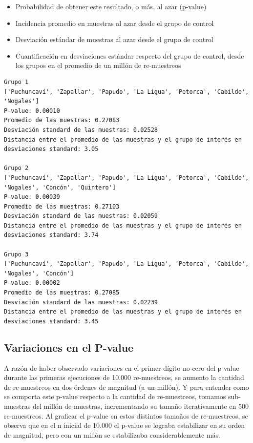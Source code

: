 \documentclass[]{article}
\providecommand{\tightlist}{%
  \setlength{\itemsep}{0pt}\setlength{\parskip}{0pt}}
\begin{document}
\begin{itemize}
\tightlist
\item
  Probabilidad de obtener este resultado, o más, al azar (p-value)
\item
  Incidencia promedio en muestras al azar desde el grupo de control
\item
  Desviación estándar de muestras al azar desde el grupo de control
\item
  Cuantificación en desviaciones estándar respecto del grupo de control, desde los grupos en el promedio de un millón de re-muestreos
\end{itemize}

\begin{verbatim}
Grupo 1
['Puchuncaví', 'Zapallar', 'Papudo', 'La Ligua', 'Petorca', 'Cabildo', 'Nogales']
P-value: 0.00010
Promedio de las muestras: 0.27083
Desviación standard de las muestras: 0.02528
Distancia entre el promedio de las muestras y el grupo de interés en desviaciones standard: 3.05

Grupo 2
['Puchuncaví', 'Zapallar', 'Papudo', 'La Ligua', 'Petorca', 'Cabildo', 'Nogales', 'Concón', 'Quintero']
P-value: 0.00039
Promedio de las muestras: 0.27103
Desviación standard de las muestras: 0.02059
Distancia entre el promedio de las muestras y el grupo de interés en desviaciones standard: 3.74

Grupo 3
['Puchuncaví', 'Zapallar', 'Papudo', 'La Ligua', 'Petorca', 'Cabildo', 'Nogales', 'Concón']
P-value: 0.00002
Promedio de las muestras: 0.27085
Desviación standard de las muestras: 0.02239
Distancia entre el promedio de las muestras y el grupo de interés en desviaciones standard: 3.45
\end{verbatim}

\hypertarget{variaciones-en-el-p-value}{%
\subsection{Variaciones en el P-value}\label{variaciones-en-el-p-value}}

A razón de haber observado variaciones en el primer dígito no-cero del
p-value durante las primeras ejecuciones de 10.000 re-muestreos, se aumento
la cantidad de re-muestreos en dos órdenes de magnitud (a un millón). Y para entender
como se comporta este p-value respecto a la cantidad de re-muestreos,
tomamos sub-muestras del millón de muestras, incrementando su tamaño iterativamente en 500 re-muestreos. Al
graficar el p-value en estos distintos tamaños de re-muestreos, se
observa que en el n inicial de 10.000 el p-value se lograba estabilizar en su orden
de magnitud, pero con un millón se estabilizaba considerablemente más.
\end{document}
